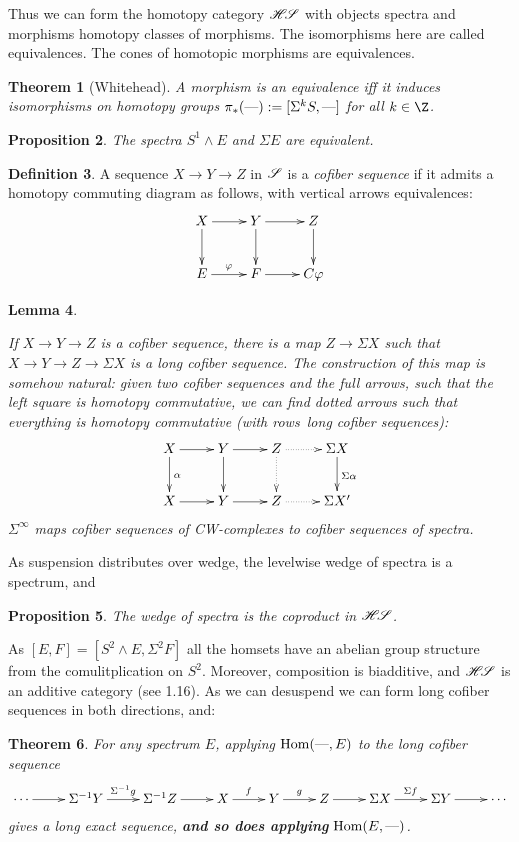 \documentclass[11pt]{article}
\theoremstyle{plain}
\newtheorem{thm}{Theorem}[subsection]
\newtheorem{lem}[thm]{Lemma}
\newtheorem{prop}[thm]{Proposition}
\theoremstyle{definition}
\newtheorem{defn}[thm]{Definition}
\newcommand{\HS}{\scrH\!\scrS}
\begin{document}
\noindent Thus we can form the homotopy category $\HS$ with objects spectra and
morphisms homotopy classes of morphisms. The isomorphisms here are called
equivalences. The cones of homotopic morphisms are equivalences.
\begin{thm}[Whitehead]
A morphism is an equivalence iff it induces isomorphisms on homotopy groups 
$\pi_*(\textup{---}):=[\Sigma^kS,\textup{---}]$ for all $k\in\Z$.
\end{thm}
\begin{prop}
The spectra $S^1\wedge E$ and $\Sigma E$ are equivalent.
\end{prop}
\begin{defn} 
A sequence $X\to Y\to Z$ in $\mathscr{S}$ is a \emph{cofiber sequence} if it admits a
homotopy commuting diagram as follows, with vertical arrows equivalences:
\[\xymatrix{
X\ar[r]\ar[d]&Y\ar[r]\ar[d]&Z\ar[d]\\
E\ar[r]^\phi&F\ar[r]&C\phi
}\]
\end{defn}
\begin{lem}\hfil
\begin{itemise}
\itm[(i)]If $X\to Y\to Z$ is a cofiber sequence, there is a map $Z\to \Sigma X$
such that $X\to Y\to Z\to \Sigma X$ is a long cofiber sequence.
\itm[(ii)]The construction of this map is somehow natural: given two cofiber
sequences and the full arrows, such that the left square is homotopy
commutative, we can find dotted arrows such that everything is homotopy
commutative (with rows\ long cofiber sequences):
\[\xymatrix{
X\ar[r]\ar[d]^\alpha&
Y\ar[r]\ar[d]&Z\ar@{.>}[d]\ar@{.>}[r]&
\Sigma X\ar[d]^{\Sigma\alpha}\\
X\ar[r]&Y\ar[r]&Z\ar@{.>}[r]&\Sigma X'
}\]
\itm[(iii)]$\Sigma^\infty$ maps cofiber sequences of CW-complexes to cofiber
sequences of spectra.
\end{itemise}
\end{lem}
As suspension distributes over wedge, the levelwise wedge of spectra is a
spectrum, and
\begin{prop}
The wedge of spectra is the coproduct in $\HS$.
\end{prop}
As $[E,F]=[S^2\wedge E,\Sigma^2F]$ all the homsets have an abelian group
structure from the comulitplication on $S^2$. Moreover, composition is
biadditive, and $\HS$ is an additive category (see 1.16). As we can desuspend we
can form long cofiber sequences in both directions, and:
\begin{thm}
For any spectrum $E$, applying $\operatorname{Hom}(\textup{---},E)$ to the long cofiber sequence
\[\xymatrix{
\cdots\ar[r]&\Sigma^{-1}Y\ar[r]^{\Sigma^{-1}g}&
\Sigma^{-1}Z\ar[r]&X\ar[r]^f&
Y\ar[r]^g&Z\ar[r]&\Sigma X\ar[r]^{\Sigma f}&\Sigma Y\ar[r]&\cdots
}\]
gives a long exact sequence, \textbf{and so does applying} $\operatorname{Hom}(E,\textup{---})$.
\end{thm}
\end{document}
